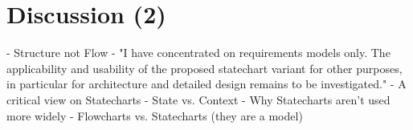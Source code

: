 \chapter{Discussion (2)}
- Structure not Flow \autocite{melia_comparison_2016}
- "I have concentrated on requirements models only. The applicability and usability of the proposed statechart variant for other purposes, in particular for architecture and detailed design remains to be investigated." \autocite[5]{glinz_statecharts_2002}
- A critical view on Statecharts \autocite{breen_statecharts_2004}
- State vs. Context \autocite[36]{leveson_experiences_1991}
- Why Statecharts aren't used more widely \autocite[9]{harel_statecharts_2007}
- Flowcharts vs. Statecharts (they are a model) \autocite[10]{harel_statecharts_2007}